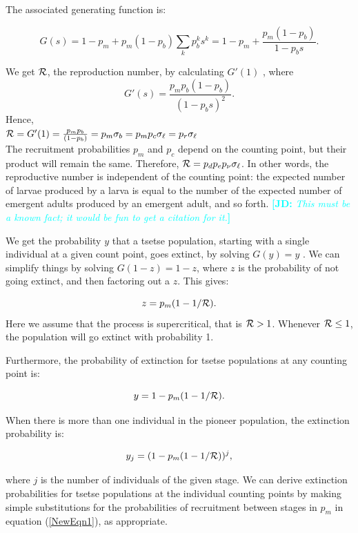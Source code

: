 \documentclass[smallextended]{svjour3}
\newcommand{\comment}[3]{\textcolor{#1}{\textbf{[#2: }\textit{#3}\textbf{]}}}
\newcommand{\jd}[1]{\comment{cyan}{JD}{#1}}
\begin{document}
The associated generating function  is:

$$G(s) = 1-p_m + p_m (1-p_b) \sum_k p_b^k s^k = 1-p_m + \frac{p_m (1-p_b)}{1-p_b s}.$$

We get ${\cal R}$, the reproduction number, by calculating $G'(1)$ \cite{bartlett1949some}, where $$G'(s) = \frac{p_m p_b (1-p_b)}{(1-p_b s)^2}.$$  Hence, \\

$ {\cal R}= G'(1) = \frac{p_m p_b}{(1-p_b)} = p_m \sigma_b = p_mp_c \sigma_\ell =  p_r\sigma_\ell$ \\

The recruitment probabilities $p_m$ and $p_c$ depend on the counting point, but their product will remain the same. Therefore, ${\cal R} =p_dp_ep_{\nu} \sigma_{\ell}$. In other words, the reproductive number is independent of the counting point: the expected number of larvae produced by a larva is equal to the number of the expected number of emergent adults produced by an emergent adult, and so forth.
\jd{This must be a known fact; it would be fun to get a citation for it.}

We get the probability $y$ that a tsetse population, starting with a single individual at a given count point, goes extinct, by solving $G(y) = y$ \cite{bartlett1949some}. We can simplify things by solving   $G(1-z) = 1-z$, where $z$ is the probability of not going extinct, and then factoring out a $z$. This gives:

$$ z = p_m(1-1/{\cal R}).$$  
Here we assume that the process is supercritical, that is ${\cal R} > 1$. Whenever ${\cal R} \leq 1$, the population will go extinct with probability 1. 

Furthermore, the probability of extinction for tsetse populations at any counting point is:

\begin{equation}
	\label{NewEqn1}	
	y = 1 - p_m(1-1/{\cal R}).	
\end{equation}

When there is more than one individual in the pioneer population, the extinction probability is:

$$y_j = (1 - p_m(1-1/{\cal R}))^j,$$

where $j$ is the number of individuals of the given stage. We can derive extinction probabilities for tsetse populations at the individual counting points by making simple substitutions for the probabilities of recruitment  between stages in $p_m$  in equation (\ref{NewEqn1}), as appropriate. 
\end{document}
